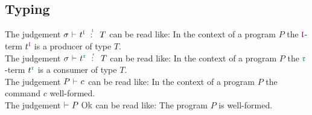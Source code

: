 \begin{prooftree}
\end{prooftree}
\vspace*{0.3cm}

\begin{prooftree}
\end{prooftree}
\vspace*{0.3cm}

\subsection{Typing}

The judgement $\typetmprd{\sigma}{t^{\polprd}}{T}$ can be read like: In the context of a program $P$ the $\polprd$-term $t^{\polprd}$ is a producer of type $T$.
\\
The judgement $\typetmcon{\sigma}{t^{\polcon}}{T}$ can be read like: In the context of a program $P$ the $\polcon$-term $t^{\polcon}$ is a consumer of type $T$.
\\
The judgement $\typecmd{P}{c}$ can be read like: In the context of a program $P$ the command $c$ well-formed.
\\
The judgement $\typewf{P}$ can be read like: The program $P$ is well-formed.

\begin{prooftree}
\end{prooftree}
\vspace*{0.3cm}

